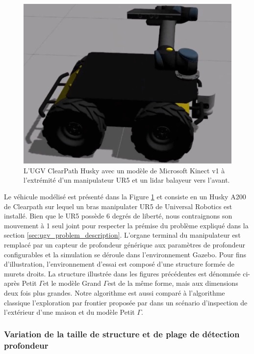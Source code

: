 \begin{figure}[h]
  \centering
  \includegraphics[width=0.5\linewidth]{images/ugv_gazebo_husky.jpg}
  \caption{L'UGV ClearPath Husky avec un modèle de Microsoft Kinect v1 à l'extrémité d'un manipulateur UR5 et un lidar balayeur vers l'avant.}
  \label{fig:ugv_gazebo_husky}
\end{figure}

Le véhicule modélisé est présenté dans la Figure \ref{fig:ugv_gazebo_husky} et consiste en un Husky A200 de Clearpath sur lequel un bras manipulater UR5 de Universal Robotics est installé. Bien que le UR5 possède 6 degrés de liberté, nous contraignons son mouvement à 1 seul joint pour respecter la prémise du problème expliqué dans la section \ref{sec:ugv_problem_description}. L'organe terminal du manipulateur est remplacé par un capteur de profondeur générique aux paramètres de profondeur configurables et la simulation se déroule dans l'environnement Gazebo. Pour fins d'illustration, l'environnement d'essai est composé d'une structure formée de murets droits. La structure illustrée dans les figures précédentes est dénommée ci-après \guillemotleft Petit $\Gamma$\guillemotright et le modèle \guillemotleft Grand $\Gamma$\guillemotright est de la même forme, mais aux dimensions deux fois plus grandes. Notre algorithme est aussi comparé à l'algorithme classique l'exploration par frontier proposée par \citep{Yamauchi1997} dans un scénario d'inspection de l'extérieur d'une maison et du modèle Petit $\Gamma$.

\subsubsection{Variation de la taille de structure et de plage de détection profondeur}

